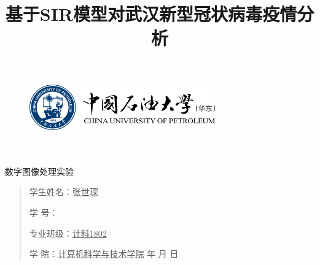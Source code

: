 \documentclass{article}
\title{基于SIR模型对武汉新型冠状病毒疫情分析}
\date{}
\renewcommand{\today}{\number\year 年 \number\month 月 \number\day 日}
\begin{document}
\begin{figure}
    \centering
    \includegraphics[width=8cm]{upc.png}

    \label{figupc}
\end{figure}

  \begin{center}
    \quad \\
    \quad \\
    \heiti \fontsize{45}{17} \quad \quad \quad 
    \vskip 1.5cm
    \heiti {} 数字图像处理实验
  \end{center}
  \vskip 2.0cm
    
  \begin{quotation}
    \doublespacing
    
        \par\setlength\parindent{7em}
    \qquad 

    学生姓名：\underline{\qquad  张世琛 \qquad \qquad}

    学\hspace{0.61cm} 号：\underline{\qquad}
    
    专业班级：\underline{\qquad 计科1802 \qquad  }
    
    学\hspace{0.61cm} 院：\underline{计算机科学与技术学院}
    \vskip 5cm
    \centering
    \vskip 2cm
    \today
  \end{quotation}
\end{document}
